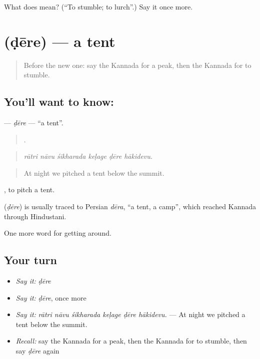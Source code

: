 \begin{tcolorbox}[breakable,colback=teal!4,colframe=teal!35!black,title={Before you move on}]
What does  mean? (\textquotedblleft{}To stumble; to lurch\textquotedblright{}.) Say it once more.
\end{tcolorbox}
\section[\texorpdfstring{\kn{ಡೇರೆ} (ḍēre)}{ಡೇರೆ (ḍēre)}]{ (ḍēre) — a tent}

\label{lesson:KA-C459-dere}



\begin{quote}
Before the new one: say the Kannada for a peak, then the Kannada for to stumble.
\end{quote}

\subsection*{You'll want to know: }
\textbf{} — \emph{ḍēre} — \textquotedblleft{}a tent\textquotedblright{}.

\begin{quote}
     .
\end{quote}

\begin{quote}
\emph{rātri nāvu śikharada keḷage ḍēre hākidevu.}
\end{quote}

\begin{quote}
At night we pitched a tent below the summit.
\end{quote}

 , to pitch a tent.

\begin{cousinweb}
\textbf{} (\emph{ḍēre}) is usually traced to Persian \emph{dēra}, \textquotedblleft{}a tent, a camp\textquotedblright{}, which reached Kannada through Hindustani.
\end{cousinweb}

\begin{grammarlens}[title={What you've built}]
One more word for getting around.
\end{grammarlens}

\subsection*{Your turn}
\begin{itemize}
\raggedright
  \item \emph{Say it:} \emph{ḍēre}
  \item \emph{Say it:} \emph{ḍēre}, once more
  \item \emph{Say it:} \emph{rātri nāvu śikharada keḷage ḍēre hākidevu.} — At night we pitched a tent below the summit.
  \item \emph{Recall:} say the Kannada for a peak, then the Kannada for to stumble, then say \emph{ḍēre} again
\end{itemize}


